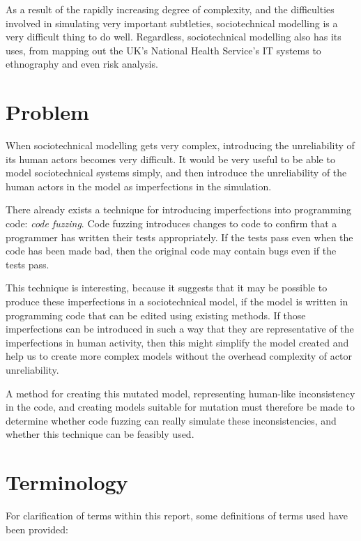 As a result of the rapidly increasing degree of complexity, and the difficulties involved in simulating very important subtleties, sociotechnical modelling is a very difficult thing to do well. Regardless, sociotechnical modelling also has its uses, from mapping out the UK's National Health Service's IT systems\cite{Brennan2007} to ethnography\cite{Crabtree2000} and even risk analysis\cite{Storer2010}. \par

\section{Problem}
When sociotechnical modelling gets very complex, introducing the unreliability of its human actors becomes very difficult. It would be very useful to be able to model sociotechnical systems simply, and then introduce the unreliability of the human actors in the model as imperfections in the simulation. \par

There already exists a technique for introducing imperfections into programming code: \emph{code fuzzing}. Code fuzzing introduces changes to code to confirm that a programmer has written their tests appropriately. If the tests pass even when the code has been made bad, then the original code may contain bugs even if the tests pass. \par

This technique is interesting, because it suggests that it may be possible to produce these imperfections in a sociotechnical model, if the model is written in programming code that can be edited using existing methods. If those imperfections can be introduced in such a way that they are representative of the imperfections in human activity, then this might simplify the model created and help us to create more complex models without the overhead complexity of actor unreliability. \par

A method for creating this mutated model, representing human-like inconsistency in the code, and creating models suitable for mutation must therefore be made to determine whether code fuzzing can really simulate these inconsistencies, and whether this technique can be feasibly used. \par

\section{Terminology}
For clarification of terms within this report, some definitions of terms used have been provided: 
\label{introducing_technology}

